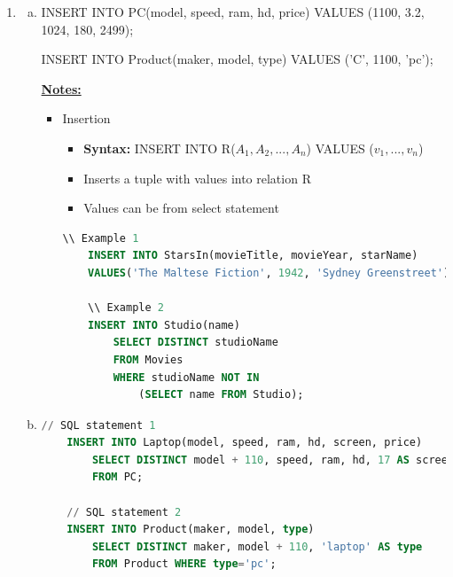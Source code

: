 \documentclass[12pt]{article}
\begin{document}
\begin{enumerate}[1.]
    \item

    \begin{enumerate}[a)]
        \item

        INSERT INTO PC(model, speed, ram, hd, price)
        VALUES (1100, 3.2, 1024, 180, 2499);

        \bigskip

        INSERT INTO Product(maker, model, type)
        VALUES ('C', 1100, 'pc');

        \bigskip

        \underline{\textbf{Notes:}}

        \bigskip

        \begin{itemize}
            \item Insertion
            \begin{itemize}
                \item \textbf{Syntax:} INSERT INTO R($A_1,A_2,...,A_n$) VALUES ($v_1,...,v_n$)
                \item Inserts a tuple with values into relation R
                \item Values can be from select statement
            \end{itemize}

            \bigskip

    \begin{lstlisting}[language=SQL]
    \\ Example 1
    INSERT INTO StarsIn(movieTitle, movieYear, starName)
    VALUES('The Maltese Fiction', 1942, 'Sydney Greenstreet');

    \\ Example 2
    INSERT INTO Studio(name)
        SELECT DISTINCT studioName
        FROM Movies
        WHERE studioName NOT IN
            (SELECT name FROM Studio);
    \end{lstlisting}
        \end{itemize}

        \item

    \begin{lstlisting}[language=SQL]
    // SQL statement 1
    INSERT INTO Laptop(model, speed, ram, hd, screen, price)
        SELECT DISTINCT model + 110, speed, ram, hd, 17 AS screen, price + 500
        FROM PC;

    // SQL statement 2
    INSERT INTO Product(maker, model, type)
        SELECT DISTINCT maker, model + 110, 'laptop' AS type
        FROM Product WHERE type='pc';
    \end{lstlisting}


\end{enumerate}
\end{enumerate}
\end{document}
